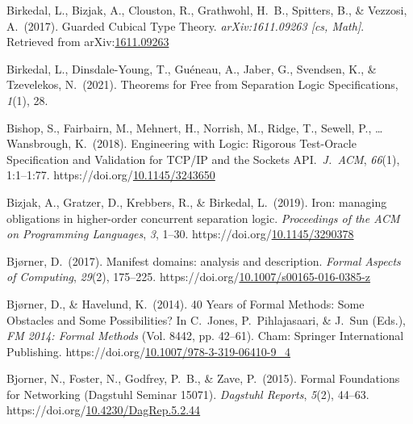 \documentclass[12pt,twoside]{article}
\begin{document}
{\begin{thebibliography}{1079}
\mdbibitemlabel{}Birkedal, L., Bizjak, A., Clouston, R., Grathwohl, H.~B., Spitters, B., \& Vezzosi, A.~(2017). Guarded Cubical Type Theory. \emph{arXiv:1611.09263 {}[cs, Math]}. Retrieved from arXiv:\href{http://arxiv.org/abs/1611.09263}{1611.09263}%

\mdbibitemlabel{}Birkedal, L., Dinsdale-Young, T., Guéneau, A., Jaber, G., Svendsen, K., \& Tzevelekos, N.~(2021). Theorems for Free from Separation Logic Specifications, \emph{1}(1), 28.%

\mdbibitemlabel{}Bishop, S., Fairbairn, M., Mehnert, H., Norrish, M., Ridge, T., Sewell, P., … Wansbrough, K.~(2018). Engineering with Logic: Rigorous Test-Oracle Specification and Validation for TCP/IP and the Sockets API.~\emph{J.~ACM}, \emph{66}(1), 1:1–1:77. https://doi.org/\href{https://dx.doi.org/10.1145/3243650}{10.1145/3243650}%

\mdbibitemlabel{}Bizjak, A., Gratzer, D., Krebbers, R., \& Birkedal, L.~(2019). Iron: managing obligations in higher-order concurrent separation logic. \emph{Proceedings of the ACM on Programming Languages}, \emph{3}, 1–30. https://doi.org/\href{https://dx.doi.org/10.1145/3290378}{10.1145/3290378}%

\mdbibitemlabel{}Bjørner, D.~(2017). Manifest domains: analysis and description. \emph{Formal Aspects of Computing}, \emph{29}(2), 175–225. https://doi.org/\href{https://dx.doi.org/10.1007/s00165-016-0385-z}{10.1007/s00165-016-0385-z}%

\mdbibitemlabel{}Bjørner, D., \& Havelund, K.~(2014). 40 Years of Formal Methods: Some Obstacles and Some Possibilities? In C.~Jones, P.~Pihlajasaari, \& J.~Sun (Eds.), \emph{FM 2014: Formal Methods} (Vol. 8442, pp. 42–61). Cham: Springer International Publishing. https://doi.org/\href{https://dx.doi.org/10.1007/978-3-319-06410-9_4}{10.1007/978-3-319-06410-9\_4}%

\mdbibitemlabel{}Bjorner, N., Foster, N., Godfrey, P.~B., \& Zave, P.~(2015). Formal Foundations for Networking (Dagstuhl Seminar 15071). \emph{Dagstuhl Reports}, \emph{5}(2), 44–63. https://doi.org/\href{https://dx.doi.org/10.4230/DagRep.5.2.44}{10.4230/DagRep.5.2.44}%


\end{thebibliography}}
\end{document}
